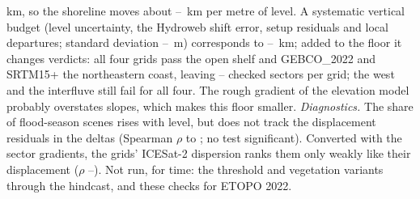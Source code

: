 km, so the shoreline moves about --~km per metre of level. A systematic vertical budget (level uncertainty, the Hydroweb shift error, setup residuals and local departures; standard deviation --~m) corresponds to --~km; added to the floor it changes  verdicts: all four grids pass the open shelf and GEBCO\_2022 and SRTM15+ the northeastern coast, leaving -- checked sectors per grid; the west and the interfluve still fail for all four. The rough gradient of the elevation model probably overstates slopes, which makes this floor smaller. \emph{Diagnostics.} The share of flood-season scenes rises with level, but does not track the displacement residuals in the deltas (Spearman $\rho$  to ; no test significant). Converted with the sector gradients, the grids' ICESat-2 dispersion ranks them only weakly like their displacement ($\rho$ --). Not run, for time: the threshold and vegetation variants through the hindcast, and these checks for ETOPO 2022.

